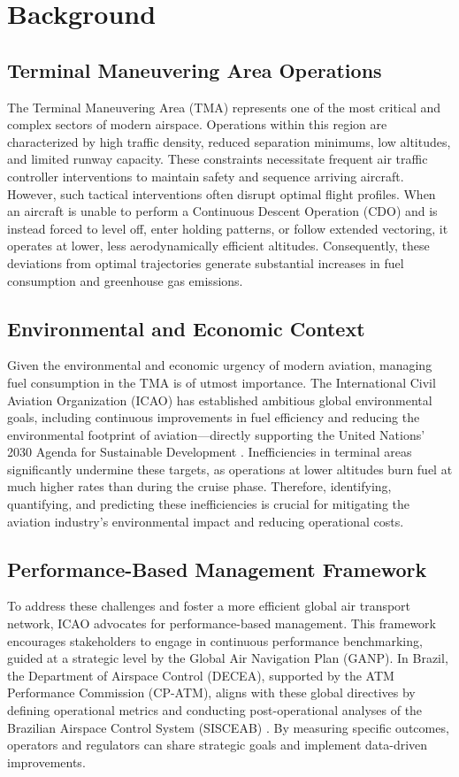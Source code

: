 \section{Background}
\label{sec:background}

\subsection{Terminal Maneuvering Area Operations}
The Terminal Maneuvering Area (TMA) represents one of the most critical and complex sectors of modern airspace. Operations within this region are characterized by high traffic density, reduced separation minimums, low altitudes, and limited runway capacity. These constraints necessitate frequent air traffic controller interventions to maintain safety and sequence arriving aircraft. However, such tactical interventions often disrupt optimal flight profiles. When an aircraft is unable to perform a Continuous Descent Operation (CDO) and is instead forced to level off, enter holding patterns, or follow extended vectoring, it operates at lower, less aerodynamically efficient altitudes. Consequently, these deviations from optimal trajectories generate substantial increases in fuel consumption and greenhouse gas emissions.

\subsection{Environmental and Economic Context}
Given the environmental and economic urgency of modern aviation, managing fuel consumption in the TMA is of utmost importance. The International Civil Aviation Organization (ICAO) has established ambitious global environmental goals, including continuous improvements in fuel efficiency and reducing the environmental footprint of aviation—directly supporting the United Nations' 2030 Agenda for Sustainable Development \cite{doc9750}. Inefficiencies in terminal areas significantly undermine these targets, as operations at lower altitudes burn fuel at much higher rates than during the cruise phase. Therefore, identifying, quantifying, and predicting these inefficiencies is crucial for mitigating the aviation industry's environmental impact and reducing operational costs.

\subsection{Performance-Based Management Framework}
To address these challenges and foster a more efficient global air transport network, ICAO advocates for performance-based management. This framework encourages stakeholders to engage in continuous performance benchmarking, guided at a strategic level by the Global Air Navigation Plan (GANP). In Brazil, the Department of Airspace Control (DECEA), supported by the ATM Performance Commission (CP-ATM), aligns with these global directives by defining operational metrics and conducting post-operational analyses of the Brazilian Airspace Control System (SISCEAB) \cite{mca10022}. By measuring specific outcomes, operators and regulators can share strategic goals and implement data-driven improvements.

